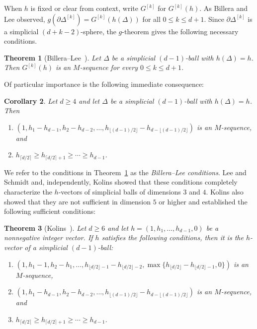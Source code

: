 \documentclass[11pt]{article}
\newtheorem{theorem}{Theorem}[section]
\newtheorem{corollary}[theorem]{Corollary}
\theoremstyle{definition}
\numberwithin{equation}{theorem}
\begin{document}
When $h$ is fixed or clear from context, write $G^{[k]}$ for $G^{[k]}(h)$. As Billera and Lee observed,
$g(\partial \Delta^{[k]})=G^{[k]}(h(\Delta))$
for all $0\leq k\leq d+1$. Since $\partial \Delta^{[k]}$ is a simplicial $(d+k-2)$-sphere, the $g$-theorem gives the following necessary conditions.

\begin{theorem}[Billera--Lee~\cite{BilleraLeeNumbersFacesPolytope1981}] \label{thm:BilleraLee}
    Let $\Delta$ be a simplicial $(d-1)$-ball with $h(\Delta)=h$. Then $G^{[k]}(h)$ is an $M$-sequence for every $0\le k\le d+1$.
\end{theorem}

Of particular importance is the following immediate consequence:

\begin{corollary}\label{cor:fromBilleraLee}
Let $d\geq 4$ and let $\Delta$ be a simplicial $(d-1)$-ball with $h(\Delta)=h$. Then
\begin{enumerate}
\item $(1, h_1-h_{d-1}, h_2-h_{d-2}, \ldots, h_{\lfloor (d-1)/2 \rfloor}-h_{d-\lfloor (d-1)/2 \rfloor})$ is an $M$-sequence, and
\item $h_{\lceil d/2 \rceil} \geq h_{\lceil d/2 \rceil +1} \geq \cdots \geq h_{d-1}$.
\end{enumerate}
\end{corollary}

We refer to the conditions in Theorem~\ref{thm:BilleraLee} as the \emph{Billera--Lee conditions}. Lee and Schmidt \cite{LeeSchmidt2011} and, independently, Kolins \cite{Kolins2011} showed that these conditions completely characterize the $h$-vectors of simplicial balls of dimensions $3$ and $4$. Kolins \cite{Kolins2011} also showed that they are not sufficient in dimension $5$ or higher and established the following sufficient conditions:


\begin{theorem}[{Kolins~\cite[Theorems 14 and 17]{Kolins2011}}] \label{thm:Kolins}
	Let $d\geq 6$ and let $h= (1, h_1, \ldots, h_{d-1}, 0)$ be a nonnegative integer vector.  If $h$ satisfies the following conditions, then it is the $h$-vector of a simplicial $(d-1)$-ball:
	\begin{enumerate}
	\item $(1, h_1-1, h_2-h_1, \ldots, h_{\lfloor d/2 \rfloor-1} - h_{\lfloor d/2 \rfloor-2}, \max\{h_{\lfloor d/2 \rfloor} - h_{\lfloor d/2 \rfloor-1},0\})$ is an $M$-sequence, 
	\item $(1, h_1-h_{d-1}, h_2-h_{d-2}, \ldots, h_{\lfloor (d-1)/2 \rfloor}-h_{d-\lfloor (d-1)/2 \rfloor})$ is an $M$-sequence, and
	\item $h_{\lceil d/2 \rceil} \geq h_{\lceil d/2 \rceil +1} \geq \cdots \geq h_{d-1}$.
	\end{enumerate} 
\end{theorem}
\end{document}
